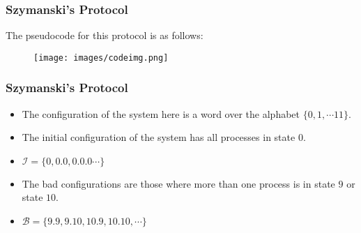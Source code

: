 \documentclass{beamer}
\begin{document}
{        \begin{frame}[fragile]
            \frametitle{Szymanski's Protocol}
            The pseudocode for this protocol is as follows:
            \begin{figure}
                \begin{center}
                    \texttt{[image: images/codeimg.png]}
                \end{center}
            \end{figure}
        \end{frame}

        \begin{frame}
            \frametitle{Szymanski's Protocol}
            \begin{itemize}
                \item The configuration of the system here is a word over the alphabet $\{0, 1, \cdots 11\}$.
                \item The initial configuration of the system has all processes in state $0$.
                \item $\mathcal{I} = \{0, 0.0, 0.0.0 \cdots\}$
                \item The bad configurations are those where more than one process is in state $9$ or state $10$.
                \item $\mathcal{B} = \{9.9, 9.10, 10.9, 10.10, \cdots\}$
            \end{itemize}
        \end{frame}
    }
\end{document}
